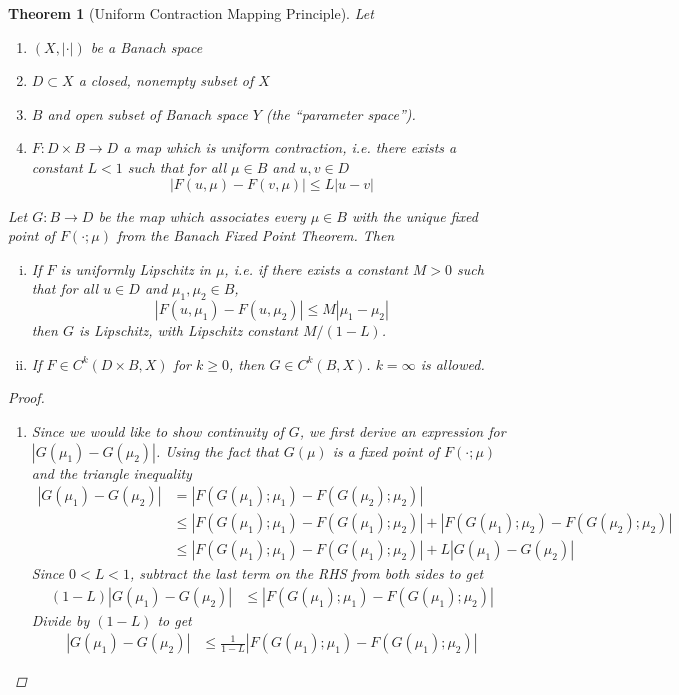 \documentclass[12pt]{amsart}         %
\newtheorem{theorem}{Theorem}[section]
\theoremstyle{remark}
\begin{document}
\begin{theorem}[Uniform Contraction Mapping Principle]
Let 
\begin{enumerate}
\item $(X, |\cdot|)$ be a Banach space
\item $D \subset X$ a closed, nonempty subset of $X$
\item $B$ and open subset of Banach space $Y$ (the ``parameter space'').
\item $F: D \times B \rightarrow D$ a map which is \emph{uniform contraction}, i.e. there exists a constant $L < 1$ such that for all $\mu \in B$ and $u, v \in D$
\begin{equation}
|F(u, \mu) - F(v, \mu)| \leq L|u - v|
\end{equation}
\end{enumerate}

Let $G: B \rightarrow D$ be the map which associates every $\mu \in B$ with the unique fixed point of $F(\cdot; \mu)$ from the Banach Fixed Point Theorem. Then

\begin{enumerate}[(i)]
\item If $F$ is uniformly Lipschitz in $\mu$, i.e. if there exists a constant $M > 0$ such that for all $u \in D$ and $\mu_1, \mu_2 \in B$, 
\[
|F(u, \mu_1) - F(u, \mu_2)| \leq M |\mu_1 - \mu_2|
\]
then $G$ is Lipschitz, with Lipschitz constant $M / (1 - L)$.
\item If $F \in C^k(D \times B, X)$ for $k \geq 0$, then $G \in C^k(B, X)$. $k = \infty$ is allowed.
\end{enumerate}
\begin{proof}

\begin{enumerate}
Define $G(\mu)$ as in the statement of the theorem. By the Banach Fixed Point Theorem, $G: D \rightarrow B$ is the unique function so that $F(x; \mu) = x$ if and only if $x = G(\mu)$. We proceed in the following steps.

\item Since we would like to show continuity of $G$, we first derive an expression for $|G(\mu_1) - G(\mu_2)|$. Using the fact that $G(\mu)$ is a fixed point of $F(\cdot; \mu)$ and the triangle inequality
\begin{align*}
|G(\mu_1) - G(\mu_2)| &= |F( G(\mu_1); \mu_1) - F(G(\mu_2); \mu_2)| \\
&\leq |F( G(\mu_1); \mu_1) - F(G(\mu_1); \mu_2)| + |F( G(\mu_1); \mu_2) - F(G(\mu_2); \mu_2)| \\
&\leq |F( G(\mu_1); \mu_1) - F(G(\mu_1); \mu_2)| + L |G(\mu_1) - G(\mu_2)|
\end{align*}
Since $0 < L < 1$, subtract the last term on the RHS from both sides to get
\begin{align*}
(1 - L)|G(\mu_1) - G(\mu_2)| 
&\leq |F( G(\mu_1); \mu_1) - F(G(\mu_1); \mu_2)|
\end{align*}
Divide by $(1 - L)$ to get 
\begin{align}\label{Gmudiff}
|G(\mu_1) - G(\mu_2)| &\leq \frac{1}{1-L}|F( G(\mu_1); \mu_1) - F(G(\mu_1); \mu_2)|
\end{align}


\end{enumerate}
\end{proof}
\end{theorem}
\end{document}
